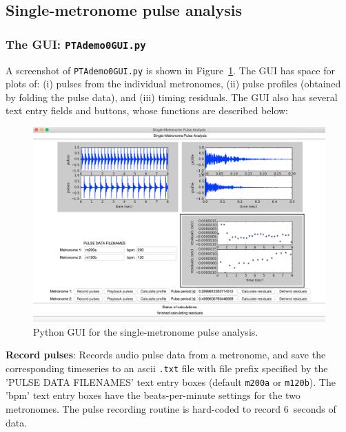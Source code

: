 \documentclass[10pt]{NSF}
\begin{document}
\subsection{Single-metronome pulse analysis}
\label{s:PTAdemo0GUI}

\subsubsection{The GUI: {\tt PTAdemo0GUI.py}}

A screenshot of {\tt PTAdemo0GUI.py} is shown in 
Figure~\ref{f:PTAdemo0GUI}.
The GUI has space for plots of:
(i) pulses from the individual metronomes,
(ii) pulse profiles (obtained by folding the pulse data),
and 
(iii) timing residuals.
The GUI also has several text entry fields and buttons, whose functions
are described below:
%
\begin{figure}[hbtp!]
\begin{center}
\includegraphics[clip=true, angle=0, width=\textwidth]{figures/PTAdemo0GUI.png}
\caption{Python GUI for the single-metronome pulse analysis.}
\label{f:PTAdemo0GUI}
\end{center}
\end{figure}

{\bf Record pulses}:
Records audio pulse data from a metronome, and save the corresponding
timeseries to an ascii {\tt .txt} file with file prefix specified by 
the 'PULSE DATA FILENAMES' text entry boxes (default {\tt m200a} or {\tt m120b}).
The 'bpm' text entry boxes have the beats-per-minute settings for 
the two metronomes. 
The pulse recording routine is hard-coded to record 6~seconds of data.
\end{document}
